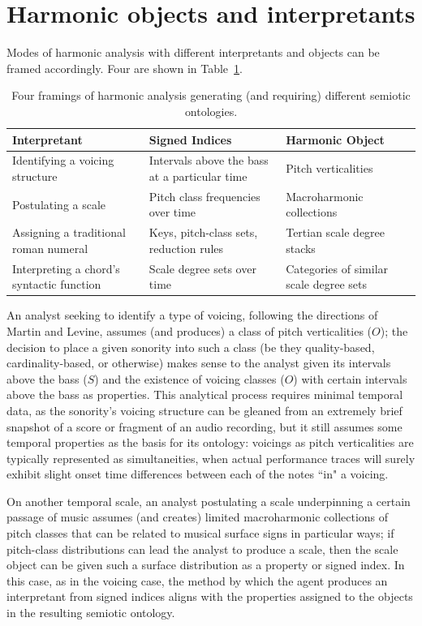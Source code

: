 \section{Harmonic objects and interpretants}
Modes of harmonic analysis with different interpretants and objects can be framed accordingly.  Four are shown in Table~\ref{frames}.
\begin{table}%
  \caption{Four framings of harmonic analysis generating (and requiring) different semiotic ontologies.}
  \centering
\begin{tabular}{p{1.75in} |p{2in} | p{2in}}
\hline\hline
Interpretant & Signed Indices & Harmonic Object \\ [0.5ex]
\hline
Identifying a voicing structure & Intervals above the bass at a particular time & Pitch verticalities \\
Postulating a scale & Pitch class frequencies over time & Macroharmonic collections \\
Assigning a traditional roman numeral & Keys, pitch-class sets, reduction rules & Tertian scale degree stacks \\
Interpreting a chord's syntactic function & Scale degree sets over time & Categories of similar scale degree sets \\[1ex]
\hline
\end{tabular}
\label{frames}
\end{table}
An analyst seeking to identify a type of voicing, following the directions of Martin and Levine, assumes (and produces) a class of pitch verticalities ($O$); the decision to place a given sonority into such a class (be they quality-based, cardinality-based, or otherwise) makes sense to the analyst given its intervals above the bass ($S$) and the existence of voicing classes ($O$) with certain intervals above the bass as properties.  This analytical process requires minimal temporal data, as the sonority's voicing structure can be gleaned from an extremely brief snapshot of a score or fragment of an audio recording, but it still assumes some temporal properties as the basis for its ontology: voicings as pitch verticalities are typically represented as simultaneities, when actual performance traces will surely exhibit slight onset time differences between each of the notes ``in" a voicing.

On another temporal scale, an analyst postulating a scale underpinning a certain passage of music assumes (and creates) limited macroharmonic collections of pitch classes that can be related to musical surface signs in particular ways; if pitch-class distributions can lead the analyst to produce a scale, then the scale object can be given such a surface distribution as a property or signed index.  In this case, as in the voicing case, the method by which the agent produces an interpretant from signed indices aligns with the properties assigned to the objects in the resulting semiotic ontology.

